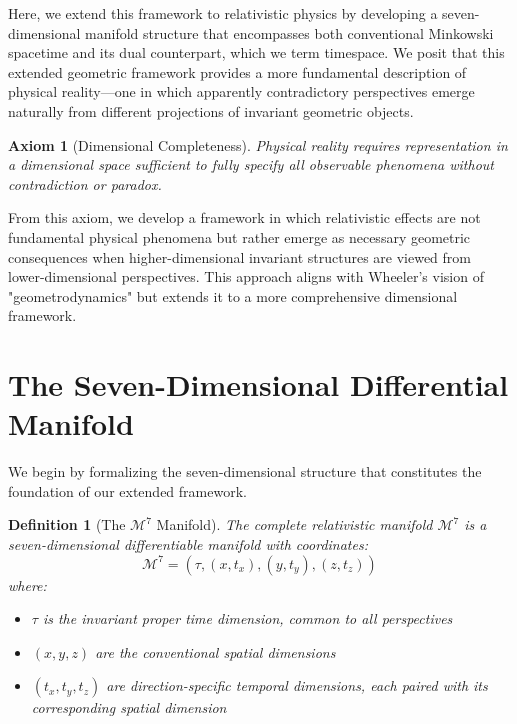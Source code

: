 \documentclass{article}
\newtheorem{definition}{Definition}
\newtheorem{axiom}{Axiom}
\begin{document}
Here, we extend this framework to relativistic physics by developing a seven-dimensional manifold structure that encompasses both conventional Minkowski spacetime and its dual counterpart, which we term timespace. We posit that this extended geometric framework provides a more fundamental description of physical reality—one in which apparently contradictory perspectives emerge naturally from different projections of invariant geometric objects.

\begin{axiom}[Dimensional Completeness]
Physical reality requires representation in a dimensional space sufficient to fully specify all observable phenomena without contradiction or paradox.
\end{axiom}

From this axiom, we develop a framework in which relativistic effects are not fundamental physical phenomena but rather emerge as necessary geometric consequences when higher-dimensional invariant structures are viewed from lower-dimensional perspectives. This approach aligns with Wheeler's vision of "geometrodynamics" but extends it to a more comprehensive dimensional framework.

\section{The Seven-Dimensional Differential Manifold}

We begin by formalizing the seven-dimensional structure that constitutes the foundation of our extended framework.

\begin{definition}[The $\mathcal{M}^7$ Manifold]
The complete relativistic manifold $\mathcal{M}^7$ is a seven-dimensional differentiable manifold with coordinates:
\begin{equation}
\mathcal{M}^7 = (\tau, (x, t_x), (y, t_y), (z, t_z))
\end{equation}
where:
\begin{itemize}
\item $\tau$ is the invariant proper time dimension, common to all perspectives
\item $(x, y, z)$ are the conventional spatial dimensions
\item $(t_x, t_y, t_z)$ are direction-specific temporal dimensions, each paired with its corresponding spatial dimension
\end{itemize}
\end{definition}
\end{document}
